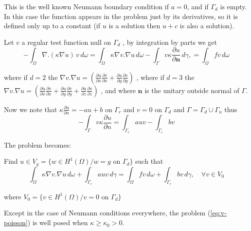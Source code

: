 \documentclass[a4paper,twoside,12pt]{book}
\def\p{\partial}
\begin{document}
\begin{note}{} This is the well known
Neumann boundary condition  if  $a=0$, and if $\Gamma_d$ is empty.
In this case the function appears in the problem just by its derivatives, so it is defined only up to a constant
 (if $u$ is a solution then  $ u+ c$ is also a solution).
\end{note}

Let  ${ v} $  a regular test function  null  on  $\Gamma_d$ , by integration by parts we get
 \begin{equation}-\int_{\Omega}  \nabla.(\kappa \nabla  u) \, { v} \,d\omega = \int_{\Omega}  \kappa \nabla{ v} . \nabla u  \,d\omega  - \int_{\Gamma} {v}
 \kappa \frac{  \p u}{\p \bm{n}}  \,d\gamma,= \int_{\Omega} f {v}  \,d\omega 
  \end{equation}

where if $d=2$ the $ \nabla{ v} . \nabla u = (\frac{\p u}{\p x}\frac{\p { v}}{\p x}
+\frac{\p u}{\p y}\frac{\p { v}}{\p y})$ ,
where if $d=3$ the $ \nabla{ v} . \nabla u = (\frac{\p u}{\p x}\frac{\p { v}}{\p x}
+\frac{\p u}{\p y}\frac{\p { v}}{\p y} + \frac{\p u}{\p z}\frac{\p { v}}{\p z})$ ,
and where $\bm{n}$ is the unitary outside normal of $\Gamma$.

Now we note that $ \kappa \frac{  \p u}{\p n} = - a u + b $  on $\Gamma_r$
and $  v = 0 $ on $ \Gamma_d $ and $ \Gamma = \Gamma_d \cup \Gamma_n $
thus
$$
  - \int_{\Gamma} {v}
 \kappa \frac{  \p u}{\p n} = \int_{\Gamma_r} a u v - \int_{\Gamma_r} b v
$$

The problem becomes:

Find   $u \in V_g = \{w \in H^1(\Omega) / w = g \mbox{ on } \Gamma_d \} $  such that
\begin{equation} {\int_{\Omega} \kappa \nabla{ v} . \nabla u  \,d\omega
 + \int_{\Gamma_r} a u v  \,d\gamma = \int_{\Omega} f {v}}  \,d\omega  + \int_{\Gamma_r} b v  \,d\gamma , \quad \forall v \in V_0 \label{eq:v-poisson}
\end{equation}

where  $  V_0 = \{v \in H^1(\Omega) / v = 0 \mbox{ on } \Gamma_d \} $

Except in the case of Neumann conditions everywhere, the problem (\ref{eq:v-poisson}) is well posed when $\kappa\geq \kappa_0>0$.
\end{document}
